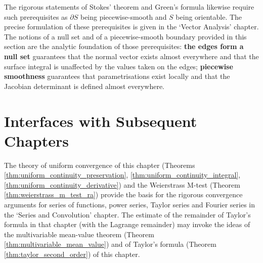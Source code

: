 \begin{remark}\label{rem:stokes_green_regularity}
The rigorous statements of Stokes' theorem and Green's formula likewise require such prerequisites as $\partial S$ being piecewise-smooth and $S$ being orientable. The precise formulation of these prerequisites is given in the `Vector Analysis' chapter. The notions of a null set and of a piecewise-smooth boundary provided in this section are the analytic foundation of those prerequisites: \textbf{the edges form a null set} guarantees that the normal vector exists almost everywhere and that the surface integral is unaffected by the values taken on the edges; \textbf{piecewise smoothness} guarantees that parametrisations exist locally and that the Jacobian determinant is defined almost everywhere.
\end{remark}

\section{Interfaces with Subsequent Chapters}

\begin{remark}\label{rem:ra_to_series}
The theory of uniform convergence of this chapter (Theorems \ref{thm:uniform_continuity_preservation}, \ref{thm:uniform_continuity_integral}, \ref{thm:uniform_continuity_derivative}) and the Weierstrass M-test (Theorem \ref{thm:weierstrass_m_test_ra}) provide the basis for the rigorous convergence arguments for series of functions, power series, Taylor series and Fourier series in the `Series and Convolution' chapter. The estimate of the remainder of Taylor's formula in that chapter (with the Lagrange remainder) may invoke the ideas of the multivariable mean-value theorem (Theorem \ref{thm:multivariable_mean_value}) and of Taylor's formula (Theorem \ref{thm:taylor_second_order}) of this chapter.
\end{remark}

